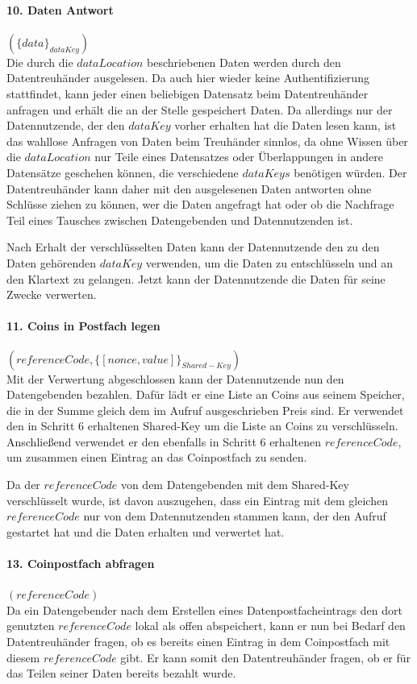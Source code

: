 \documentclass{scrreprt}
\begin{document}
\paragraph{10. Daten Antwort} $(\{data\}_{dataKey})$\\
Die durch die $dataLocation$ beschriebenen Daten werden durch den Datentreuhänder ausgelesen. Da auch hier wieder keine Authentifizierung stattfindet, kann jeder einen beliebigen Datensatz beim Datentreuhänder anfragen und erhält die an der Stelle gespeichert Daten. Da allerdings nur der Datennutzende, der den $dataKey$ vorher erhalten hat die Daten lesen kann, ist das wahllose Anfragen von Daten beim Treuhänder sinnlos, da ohne Wissen über die $dataLocation$ nur Teile eines Datensatzes oder Überlappungen in andere Datensätze geschehen können, die verschiedene $dataKeys$ benötigen würden. Der Datentreuhänder kann daher mit den ausgelesenen Daten antworten ohne Schlüsse ziehen zu können, wer die Daten angefragt hat oder ob die Nachfrage Teil eines Tausches zwischen Datengebenden und Datennutzenden ist.

Nach Erhalt der verschlüsselten Daten kann der Datennutzende den zu den Daten gehörenden $dataKey$ verwenden, um die Daten zu entschlüsseln und an den Klartext zu gelangen. Jetzt kann der Datennutzende die Daten für seine Zwecke verwerten.

\paragraph{11. Coins in Postfach legen} $(referenceCode, \{[nonce,value]\}_{Shared-Key})$\\
\label{para:payment_9}
Mit der Verwertung abgeschlossen kann der Datennutzende nun den Datengebenden bezahlen. Dafür lädt er eine Liste an Coins aus seinem Speicher, die in der Summe gleich dem im Aufruf ausgeschrieben Preis sind. Er verwendet den in Schritt 6 erhaltenen Shared-Key um die Liste an Coins zu verschlüsseln. Anschließend verwendet er den ebenfalls in Schritt 6 erhaltenen $referenceCode$, um zusammen einen Eintrag an das Coinpostfach zu senden.

Da der $referenceCode$ von dem Datengebenden mit dem Shared-Key verschlüsselt wurde, ist davon auszugehen, dass ein Eintrag mit dem gleichen $referenceCode$ nur von dem Datennutzenden stammen kann, der den Aufruf gestartet hat und die Daten erhalten und verwertet hat.

\paragraph{13. Coinpostfach abfragen} $(referenceCode)$\\
Da ein Datengebender nach dem Erstellen eines Datenpostfacheintrags den dort genutzten $referenceCode$ lokal als offen abspeichert, kann er nun bei Bedarf den Datentreuhänder fragen, ob es bereits einen Eintrag in dem Coinpostfach mit diesem $referenceCode$ gibt. Er kann somit den Datentreuhänder fragen, ob er für das Teilen seiner Daten bereits bezahlt wurde.
\end{document}
